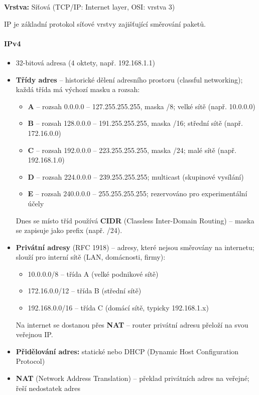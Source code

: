 \textbf{Vrstva:} Síťová (TCP/IP: Internet layer, OSI: vrstva 3)

IP je základní protokol síťové vrstvy zajišťující směrování paketů.

\paragraph{IPv4}
\begin{itemize}
  \item 32-bitová adresa (4 oktety, např. 192.168.1.1)
  \item \textbf{Třídy adres} -- historické dělení adresního prostoru (classful networking); každá třída má výchozí masku a rozsah:
    \begin{itemize}
      \item \textbf{A} -- rozsah 0.0.0.0 -- 127.255.255.255, maska /8; velké sítě (např. 10.0.0.0)
      \item \textbf{B} -- rozsah 128.0.0.0 -- 191.255.255.255, maska /16; střední sítě (např. 172.16.0.0)
      \item \textbf{C} -- rozsah 192.0.0.0 -- 223.255.255.255, maska /24; malé sítě (např. 192.168.1.0)
      \item \textbf{D} -- rozsah 224.0.0.0 -- 239.255.255.255; multicast (skupinové vysílání)
      \item \textbf{E} -- rozsah 240.0.0.0 -- 255.255.255.255; rezervováno pro experimentální účely
    \end{itemize}
    Dnes se místo tříd používá \textbf{CIDR} (Classless Inter-Domain Routing) -- maska se zapisuje jako prefix (např. /24).
  \item \textbf{Privátní adresy} (RFC 1918) -- adresy, které nejsou směrovány na internetu; slouží pro interní sítě (LAN, domácnosti, firmy):
    \begin{itemize}
      \item 10.0.0.0/8 -- třída A (velké podnikové sítě)
      \item 172.16.0.0/12 -- třída B (střední sítě)
      \item 192.168.0.0/16 -- třída C (domácí sítě, typicky 192.168.1.x)
    \end{itemize}
    Na internet se dostanou přes \textbf{NAT} -- router privátní adresu přeloží na svou veřejnou IP.
  \item \textbf{Přidělování adres:} statické nebo DHCP (Dynamic Host Configuration Protocol)
  \item \textbf{NAT} (Network Address Translation) -- překlad privátních adres na veřejné; řeší nedostatek adres
\end{itemize}

